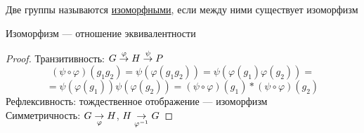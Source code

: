 \documentclass[main]{subfiles}
\begin{document}
	\begin{definition}
	    Две группы называются \ul{изоморфными}, если между ними существует изоморфизм
	\end{definition}

	\begin{utv}
	    Изоморфизм --- отношение эквивалентности
	\end{utv}

	\begin{proof}
	    Транзитивность: $G \overset{\varphi}{\rightarrow} H \overset{\psi}{\rightarrow} P$
        \[(\psi \circ \varphi)(g_1 g_2) = \psi(\varphi(g_1 g_2)) = \psi(\varphi(g_1) \varphi(g_2)) = \]
		\[= \psi(\varphi(g_1)) \psi(\varphi(g_2)) =
        (\psi \circ \varphi)(g_1) * (\psi \circ \varphi)(g_2)\]
	    Рефлексивность: тождественное отображение --- изоморфизм\\
	    Симметричность: $G \underset{\varphi}{\rightarrow} H$, $H \underset{\varphi^{-1}}{\rightarrow} G$
	\end{proof}
\end{document}
